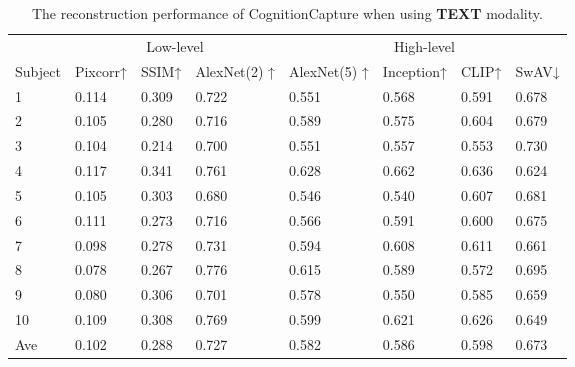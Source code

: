 \documentclass[letterpaper]{article} %
\begin{document}
\begin{table}[ht]
\centering
\begin{tabular}{llllllll}
\hline
 & \multicolumn{3}{c|}{Low-level} & \multicolumn{4}{c}{High-level} \\ \cline{2-8} 
Subject & Pixcorr↑ & SSIM↑ & AlexNet(2) ↑ & AlexNet(5) ↑ & Inception↑ & CLIP↑ & SwAV↓ \\ \hline
1 & 0.114 & 0.309 & 0.722 & 0.551 & 0.568 & 0.591 & 0.678 \\
2 & 0.105 & 0.280 & 0.716 & 0.589 & 0.575 & 0.604 & 0.679 \\
3 & 0.104 & 0.214 & 0.700 & 0.551 & 0.557 & 0.553 & 0.730 \\
4 & 0.117 & 0.341 & 0.761 & 0.628 & 0.662 & 0.636 & 0.624 \\
5 & 0.105 & 0.303 & 0.680 & 0.546 & 0.540 & 0.607 & 0.681 \\
6 & 0.111 & 0.273 & 0.716 & 0.566 & 0.591 & 0.600 & 0.675 \\
7 & 0.098 & 0.278 & 0.731 & 0.594 & 0.608 & 0.611 & 0.661 \\
8 & 0.078 & 0.267 & 0.776 & 0.615 & 0.589 & 0.572 & 0.695 \\
9 & 0.080 & 0.306 & 0.701 & 0.578 & 0.550 & 0.585 & 0.659 \\
10 & 0.109 & 0.308 & 0.769 & 0.599 & 0.621 & 0.626 & 0.649 \\
Ave & 0.102 & 0.288 & 0.727 & 0.582 & 0.586 & 0.598 & 0.673 \\ \hline
\end{tabular}
\caption{The reconstruction performance of CognitionCapture when using \textbf{TEXT} modality.}
\label{tab:recontext}
\end{table}
\end{document}
